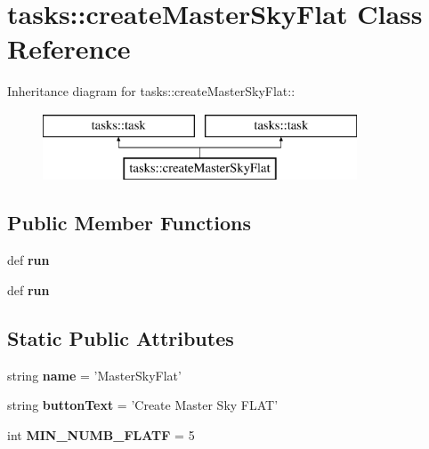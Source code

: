 \section{tasks::create\-Master\-Sky\-Flat Class Reference}
\label{classtasks_1_1createMasterSkyFlat}
Inheritance diagram for tasks::create\-Master\-Sky\-Flat::\begin{figure}[H]
\begin{center}
\leavevmode
\includegraphics[height=2cm]{classtasks_1_1createMasterSkyFlat}
\end{center}
\end{figure}
\subsection*{Public Member Functions}
\begin{CompactItemize}
\item 
def \textbf{run}\label{classtasks_1_1createMasterSkyFlat_de8c1be37632c1836eaa04b9023e8051}

\item 
def \textbf{run}\label{classtasks_1_1createMasterSkyFlat_de8c1be37632c1836eaa04b9023e8051}

\end{CompactItemize}
\subsection*{Static Public Attributes}
\begin{CompactItemize}
\item 
string \textbf{name} = '{\bfcreate\-Master\-Sky\-Flat}'\label{classtasks_1_1createMasterSkyFlat_bf573809d89f30bf8f6f6570b318a569}

\item 
string \textbf{button\-Text} = 'Create Master Sky FLAT'\label{classtasks_1_1createMasterSkyFlat_0d4e6d50999b2b2617f91b4fbae9b4d6}

\item 
int \textbf{MIN\_\-NUMB\_\-FLATF} = 5\label{classtasks_1_1createMasterSkyFlat_584092cc9af81087d26b58d3a91efe0e}

\end{CompactItemize}


